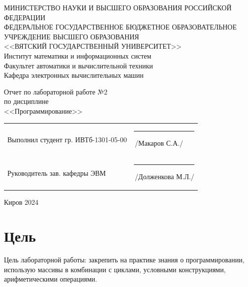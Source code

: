 \documentclass[a4paper,14pt]{extarticle}
\begin{document}
  \newpage\thispagestyle{empty}
  \begin{center}
    \MakeUppercase{
      Министерство науки и высшего образования Российской Федерации\\
      Федеральное государственное бюджетное образовательное учреждение высшего образования\\
      <<Вятский Государственный Университет>>\\
    }
    Институт математики и информационных систем\\
    Факультет автоматики и вычислительной техники\\
    Кафедра электронных вычислительных машин
  \end{center}
  \vfill

  \begin{center}
    Отчет по лабораторной работе №2\\
    по дисциплине\\
    <<Программирование>>\\
  \end{center}
  \vfill

  \noindent
  \begin{tabular}{ll}
    Выполнил студент гр. ИВТб-1301-05-00 \hspace{5mm} &
    \rule[-1mm]{25mm}{0.10mm}\,/Макаров С.А./\\
    
    Руководитель зав. кафедры ЭВМ & \rule[-1mm]{25mm}{0.10mm}\,/Долженкова М.Л./\\
  \end{tabular}

  \vfill
  \begin{center}
    Киров 2024
  \end{center}

  \newpage
  \section*{Цель}
  Цель лабораторной работы: закрепить на практике знания о программировании, использую массивы в комбинации с циклами, условными конструкциями, арифметическими операциями.
\end{document}
